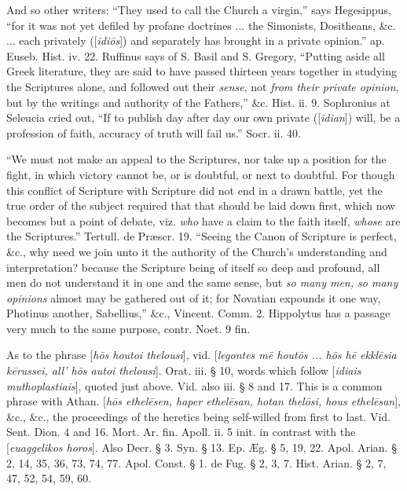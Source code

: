 And
so other writers: ``They used to call the Church a virgin,'' says
Hegesippus, ``for it was not yet defiled by profane doctrines ... the
Simonists, Dositheans, \&c. ... each privately ([\emph{idi\={o}s}])
and separately has brought in a private opinion.'' ap. Euseb. Hist. iv.
22. Ruffinus says of S. Basil and S. Gregory, ``Putting aside all Greek
literature, they are said to have passed thirteen years together in
studying the Scriptures alone, and followed out their \emph{sense},
not \emph{from their private opinion}, but by the writings and
authority of the Fathers,'' \&c. Hist. ii. 9. Sophronius at Seleucia
cried out, ``If to publish day after day our own private ([\emph{idian}])
will, be a profession of faith, accuracy of truth will fail us.'' Socr.
ii. 40.

``We
must not make an appeal to the Scriptures, nor take up a position for
the fight, in which victory cannot be, or is doubtful, or next to
doubtful. For though this conflict of Scripture with Scripture did not
end in a drawn battle, yet the true order of the subject required that
that should be laid down first, which now becomes but a point of
debate, viz. \emph{who} have a claim to the faith itself, \emph{whose}
are the Scriptures.'' Tertull. de Præscr. 19. ``Seeing the Canon of
Scripture is perfect, \&c., why need we join unto it the authority
of the Church's understanding and interpretation? because the
Scripture being of itself so deep and profound, all men do not
understand it in one and the same sense, but \emph{so many men, so many
opinions} almost may be gathered out of it; for Novatian expounds
it one way, Photinus another, Sabellius,'' \&c., Vincent. Comm. 2.
Hippolytus has a passage very much to the same purpose, contr. Noet. 9
fin.

As
to the phrase [\emph{h\={o}s houtoi thelousi}], vid. [\emph{legontes m\={e}
hout\={o}s ... h\={o}s h\={e} ekkl\={e}sia k\={e}russei,
all}\emph{' h\={o}s
autoi thelousi}].
Orat. iii. § 10, words which follow [\emph{idiais muthoplastiais}],
quoted just above. Vid. also iii. § 8 and 17. This is a common phrase
with Athan. [\emph{h\={o}s ethel\={e}sen, haper ethel\={e}san,
hotan thel\={o}si, hous ethel\={e}san}], \&c., \&c.,
the proceedings of the heretics being self-willed from first to last. Vid. Sent. Dion. 4 and 16. Mort. Ar. fin. Apoll. ii. 5 init. in
contrast with the [\emph{euaggelikos horos}]. Also Decr. § 3. Syn. §
13. Ep. Æg. § 5, 19, 22. Apol. Arian. § 2, 14, 35, 36, 73, 74, 77.
Apol. Const. § 1. de Fug. § 2, 3, 7. Hist. Arian. § 2, 7, 47, 52,
54, 59, 60.

